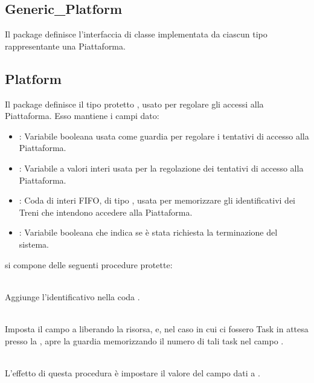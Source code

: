 	\subsection{Generic\_Platform}
	
	Il package  definisce l'interfaccia di classe  implementata da ciascun tipo rappresentante una Piattaforma.
	
	\subsection{Platform} 
	
	Il package  definisce il tipo protetto , usato per regolare gli accessi alla Piattaforma. Esso mantiene i campi dato:
	\begin{itemize}
		\item {}: Variabile booleana usata come guardia per regolare i tentativi di accesso alla Piattaforma.

		\item {}: Variabile a valori interi usata per la regolazione dei tentativi di accesso alla Piattaforma.
		
		\item {}: Coda di interi FIFO, di tipo , usata per memorizzare gli identificativi dei Treni che intendono accedere alla Piattaforma.
		\item {}: Variabile booleana che indica se è stata richiesta la terminazione del sistema.
	\end{itemize}
	 si compone delle seguenti procedure protette:
	\begin{description}

		\item {} \\
		Aggiunge l'identificativo  nella coda .

		\item {} \\
		Imposta il campo  a  liberando la risorsa, e, nel caso in cui ci fossero Task in attesa presso la  , apre la guardia  memorizzando il numero di tali task nel campo .

		\item {}\\
		L'effetto di questa procedura è impostare il valore del campo dati  a .

	\end{description}
